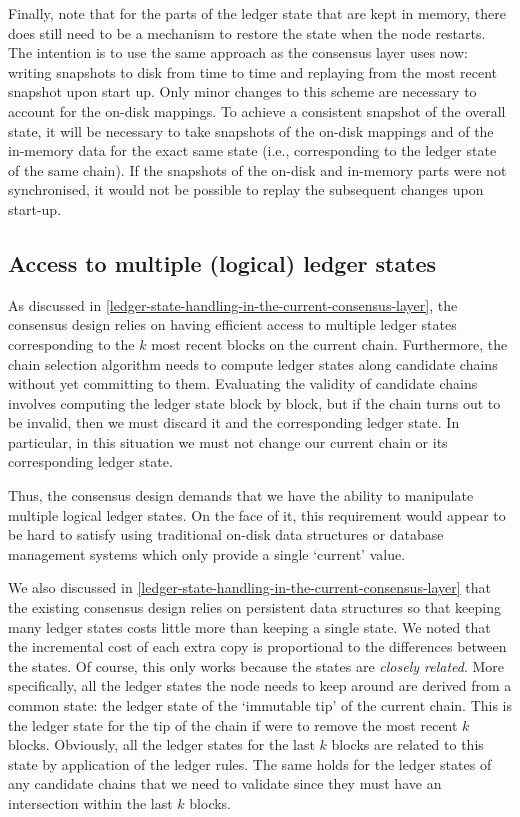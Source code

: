 \documentclass[11pt,a4paper]{article}
\begin{document}
Finally, note that for the parts of the ledger state that are kept in memory,
there does still need to be a mechanism to restore the state when the node
restarts. The intention is to use the same approach as the consensus layer uses
now: writing snapshots to disk from time to time and replaying from the most
recent snapshot upon start up. Only minor changes to this scheme are necessary
to account for the on-disk mappings. To achieve a consistent snapshot of the
overall state, it will be necessary to take snapshots of the on-disk mappings
and of the in-memory data for the exact same state (i.e., corresponding to the
ledger state of the same chain). If the snapshots of the on-disk and in-memory
parts were not synchronised, it would not be possible to replay the subsequent
changes upon start-up.

\subsection{Access to multiple (logical) ledger states}
\label{access-to-multiple-logical-ledger-states}

As discussed in \cref{ledger-state-handling-in-the-current-consensus-layer},
the consensus design relies on having efficient access to multiple ledger
states corresponding to the $k$ most recent blocks on the current chain.
Furthermore, the chain selection algorithm needs to compute ledger states along
candidate chains without yet committing to them. Evaluating the validity of
candidate chains involves computing the ledger state block by block, but if
the chain turns out to be invalid, then we must discard it and the corresponding
ledger state. In particular, in this situation we must not change our current
chain or its corresponding ledger state.

Thus, the consensus design demands that we have the ability to manipulate
multiple logical ledger states. On the face of it, this requirement would appear
to be hard to satisfy using traditional on-disk data structures or database
management systems which only provide a single `current' value.

We also discussed in \cref{ledger-state-handling-in-the-current-consensus-layer}
that the existing consensus design relies on persistent data structures so that
keeping many ledger states costs little more than keeping a single state. We noted that
the incremental cost of each extra copy is proportional to the differences
between the states. Of course, this only works because the states are
\emph{closely related}. More specifically, all the ledger states the node needs
to keep around are derived from a common state: the ledger state of the `immutable
tip' of the current chain. This is the ledger state for the tip of the chain if
were to remove the most recent $k$ blocks. Obviously, all the ledger states for
the last $k$ blocks are related to this state by application of the ledger
rules. The same holds for the ledger states of any candidate chains that we
need to validate since they must have an intersection within the last $k$
blocks.
\end{document}
